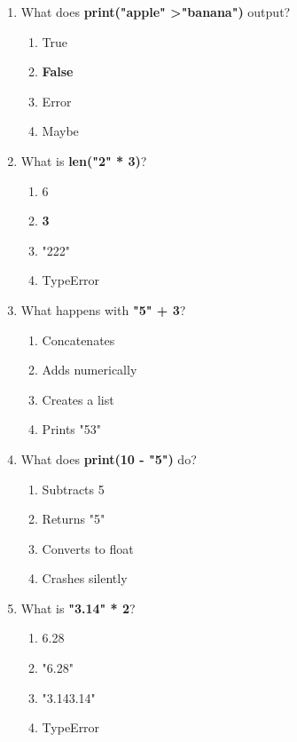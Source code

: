 \documentclass{article}
\begin{document}
\begin{multicols*}{4}
\begin{enumerate}
        \item What does \textbf{print("apple" \textgreater "banana")} output?
        \begin{enumerate}[label=(\Alph*)]
            \item True
            \item \textbf{False}
            \item Error
            \item Maybe
        \end{enumerate}

        \item What is \textbf{len("2" * 3)}?
        \begin{enumerate}[label=(\Alph*)]
            \item 6
            \item \textbf{3}
            \item "222"
            \item TypeError
        \end{enumerate}
        \item What happens with \textbf{"5" + 3}?
        \begin{enumerate}[label=(\Alph*)]
            \item Concatenates
            \item Adds numerically
            \item Creates a list
            \item Prints "53"
        \end{enumerate}

        \item What does \textbf{print(10 - "5")} do?
        \begin{enumerate}[label=(\Alph*)]
            \item Subtracts 5
            \item Returns "5"
            \item Converts to float
            \item Crashes silently
        \end{enumerate}

        \item What is \textbf{"3.14" * 2}?
        \begin{enumerate}[label=(\Alph*)]
            \item 6.28
            \item "6.28"
            \item "3.143.14"
            \item TypeError
        \end{enumerate}


\end{enumerate}
\end{multicols*}
\end{document}

